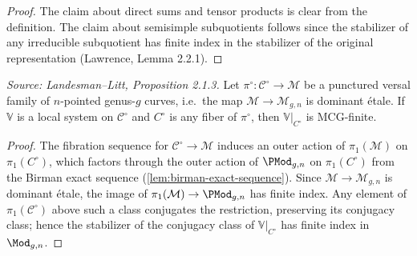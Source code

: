 \begin{proof}
  The claim about direct sums and tensor products is clear from the definition.
  The claim about semisimple subquotients follows since the stabilizer of any
  irreducible subquotient has finite index in the stabilizer of the original
  representation (Lawrence, Lemma 2.2.1).
\end{proof}

\begin{proposition}
  \label{prop:mcg-finite-family}
  \textit{Source: Landesman--Litt, Proposition 2.1.3.}
  Let $\pi^\circ\colon \mathcal{C}^\circ \to \mathcal{M}$ be a punctured versal
  family of $n$-pointed genus-$g$ curves, i.e.\ the map
  $\mathcal{M} \to \mathcal{M}_{g,n}$ is dominant \'{e}tale.
  If $\mathbb{V}$ is a local system on $\mathcal{C}^\circ$ and $C^\circ$ is any
  fiber of $\pi^\circ$, then $\mathbb{V}|_{C^\circ}$ is MCG-finite.
\end{proposition}

\begin{proof}
  The fibration sequence for $\mathcal{C}^\circ \to \mathcal{M}$ induces an
  outer action of $\pi_1(\mathcal{M})$ on $\pi_1(C^\circ)$, which factors
  through the outer action of $\PMod_{g,n}$ on $\pi_1(C^\circ)$ from the
  Birman exact sequence (\cref{lem:birman-exact-sequence}).
  Since $\mathcal{M} \to \mathcal{M}_{g,n}$ is dominant \'{e}tale, the image
  of $\pi_1(\mathcal{M}) \to \PMod_{g,n}$ has finite index.
  Any element of $\pi_1(\mathcal{C}^\circ)$ above such a class conjugates the
  restriction, preserving its conjugacy class; hence the stabilizer of the
  conjugacy class of $\mathbb{V}|_{C^\circ}$ has finite index in $\Mod_{g,n}$.
\end{proof}

